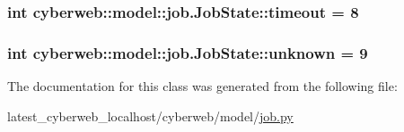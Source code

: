 \hypertarget{classcyberweb_1_1model_1_1job_1_1_job_state_a6e862b9c9ceee39cf1d0f1b5e4f8dd2d}{
\subsubsection[{timeout}]{\setlength{\rightskip}{0pt plus 5cm}int {\bf cyberweb\-::model\-::job.\-Job\-State\-::timeout} = 8}}\label{classcyberweb_1_1model_1_1job_1_1_job_state_a6e862b9c9ceee39cf1d0f1b5e4f8dd2d}
\hypertarget{classcyberweb_1_1model_1_1job_1_1_job_state_a19ed7a205d8e561f1dad0ea257145dd0}{
\subsubsection[{unknown}]{\setlength{\rightskip}{0pt plus 5cm}int {\bf cyberweb\-::model\-::job.\-Job\-State\-::unknown} = 9}}\label{classcyberweb_1_1model_1_1job_1_1_job_state_a19ed7a205d8e561f1dad0ea257145dd0}


\-The documentation for this class was generated from the following file\-:\begin{DoxyCompactItemize}
\item 
latest\-\_\-cyberweb\-\_\-localhost/cyberweb/model/\hyperlink{job_8py}{job.\-py}\end{DoxyCompactItemize}
